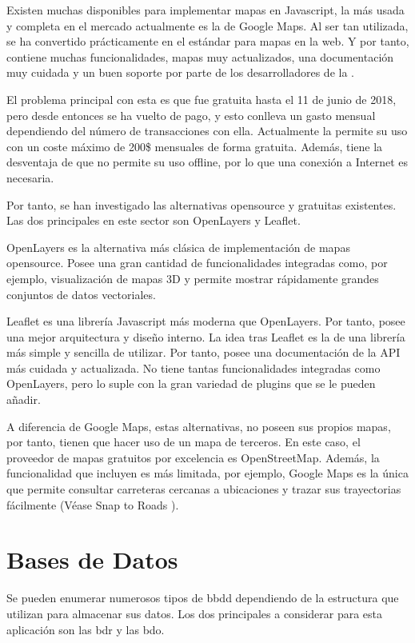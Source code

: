     Existen muchas  disponibles para implementar mapas en Javascript, la más usada y completa en el mercado actualmente es la de Google Maps\cite{gmaps}. Al ser tan utilizada, se ha convertido prácticamente en el estándar para mapas en la web. Y por tanto, contiene muchas funcionalidades, mapas muy actualizados, una documentación muy cuidada y un buen soporte por parte de los desarrolladores de la .
    
    El problema principal con esta  es que fue gratuita hasta el 11 de junio de 2018, pero desde entonces se ha vuelto de pago, y esto conlleva un gasto mensual dependiendo del número de transacciones con ella. Actualmente la  permite su uso con un coste máximo de 200\$ mensuales de forma gratuita. Además, tiene la desventaja de que no permite su uso offline, por lo que una conexión a Internet es necesaria.

    
    Por tanto, se han investigado las alternativas opensource y gratuitas existentes. Las dos  principales en este sector son OpenLayers\cite{openlayers} y Leaflet\cite{leaflet}.
    
    OpenLayers es la alternativa más clásica de implementación de mapas opensource. Posee una gran cantidad de funcionalidades integradas como, por ejemplo, visualización de mapas 3D y permite mostrar rápidamente grandes conjuntos de datos vectoriales.
    
    Leaflet es una librería Javascript más moderna que OpenLayers. Por tanto, posee una mejor arquitectura y diseño interno. La idea tras Leaflet es la de una librería más simple y sencilla de utilizar. Por tanto, posee una documentación de la API más cuidada y actualizada. No tiene tantas funcionalidades integradas como OpenLayers, pero lo suple con la gran variedad de plugins que se le pueden añadir.
    
    A diferencia de Google Maps, estas alternativas, no poseen sus propios mapas, por tanto, tienen que hacer uso de un mapa de terceros. En este caso, el proveedor de mapas gratuitos por excelencia es OpenStreetMap\cite{osm}. Además, la funcionalidad que incluyen es más limitada, por ejemplo, Google Maps es la única que permite consultar carreteras cercanas a ubicaciones y trazar sus trayectorias fácilmente (Véase Snap to Roads \cite{snaproad}).
  
  
  \section{Bases de Datos}
    Se pueden enumerar numerosos tipos de \ac{bbdd} dependiendo de la estructura que utilizan para almacenar sus datos. Los dos principales a considerar para esta aplicación son las \ac{bdr} y las \ac{bdo}.
    
